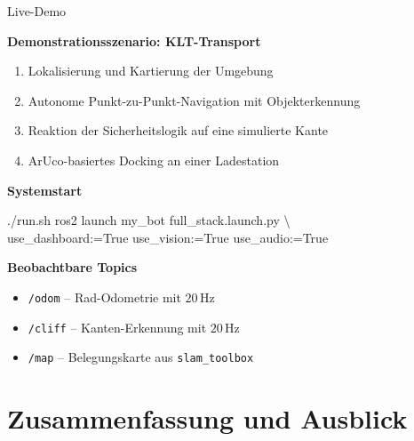 \documentclass[aspectratio=169]{beamer}
\begin{document}
\begin{frame}[fragile]{Live-Demo}

  \textbf{Demonstrationsszenario: KLT-Transport}
  \begin{enumerate}
    \item Lokalisierung und Kartierung der Umgebung
    \item Autonome Punkt-zu-Punkt-Navigation mit Objekterkennung
    \item Reaktion der Sicherheitslogik auf eine simulierte Kante
    \item ArUco-basiertes Docking an einer Ladestation
  \end{enumerate}

  \vspace{0.5em}
  \textbf{Systemstart}

  {\small\ttfamily
  ./run.sh ros2 launch my\_bot full\_stack.launch.py \textbackslash\\
  \quad use\_dashboard:=True use\_vision:=True use\_audio:=True
  }

  \vspace{0.5em}
  \textbf{Beobachtbare Topics}
  \begin{itemize}
    \item \texttt{/odom} -- Rad-Odometrie mit $20\,\mathrm{Hz}$
    \item \texttt{/cliff} -- Kanten-Erkennung mit $20\,\mathrm{Hz}$
    \item \texttt{/map} -- Belegungskarte aus \texttt{slam\_toolbox}
  \end{itemize}

\end{frame}

\section{Zusammenfassung und Ausblick}
\end{document}
